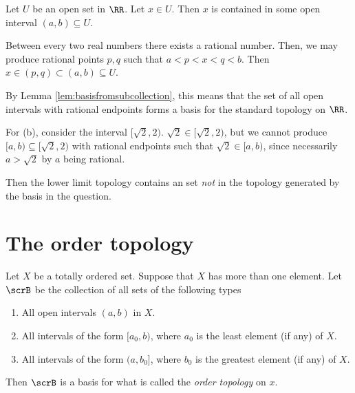 \documentclass{article}
\begin{document}
Let $U$ be an open set in $\RR$.
Let $x \in U$.
Then $x$ is contained in some open interval $(a,b) \subseteq U$.

Between every two real numbers there exists a rational number.
Then, we may produce rational points $p,q$ such that $a<p<x<q<b$.
Then $x \in (p,q) \subset (a,b) \subseteq U$.

By Lemma \ref{lem:basisfromsubcollection}, this means that the set of all open intervals with rational endpoints forms a basis for the standard topology on $\RR$.

For (b), consider the interval $[\sqrt{2}, 2)$.
$\sqrt{2} \in [\sqrt{2},2)$, but we cannot produce $[a,b) \subseteq [\sqrt{2},2)$ with rational endpoints such that $\sqrt{2} \in [a,b)$, since necessarily $a > \sqrt{2}$ by $a$ being rational.

Then the lower limit topology contains an set \textit{not} in the topology generated by the basis in the question.

\section{The order topology}

\begin{definition}
    Let $X$ be a totally ordered set.
    Suppose that $X$ has more than one element.
    Let $\scrB$ be the collection of all sets of the following types
    \begin{enumerate}[label=(\arabic*)]
        \item All open intervals $(a,b)$ in $X$.
        \item All intervals of the form $[a_0, b)$, where $a_0$ is the least element (if any) of $X$.
        \item All intervals of the form $(a, b_0]$, where $b_0$ is the greatest element (if any) of $X$.
    \end{enumerate}

    Then $\scrB$ is a basis for what is called the \textit{order topology} on $x$.
\end{definition}
\end{document}
